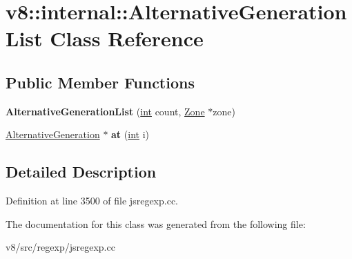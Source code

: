 \hypertarget{classv8_1_1internal_1_1AlternativeGenerationList}{}\section{v8\+:\+:internal\+:\+:Alternative\+Generation\+List Class Reference}
\label{classv8_1_1internal_1_1AlternativeGenerationList}
\subsection*{Public Member Functions}
\begin{DoxyCompactItemize}
\item 
\mbox{\label{classv8_1_1internal_1_1AlternativeGenerationList_a12e31ade267f3b97c25bf9201fe3b65a}} 
{\bfseries Alternative\+Generation\+List} (\mbox{\hyperlink{classint}{int}} count, \mbox{\hyperlink{classv8_1_1internal_1_1Zone}{Zone}} $\ast$zone)
\item 
\mbox{\label{classv8_1_1internal_1_1AlternativeGenerationList_a074eac77994a3714b4214b777fce5b2a}} 
\mbox{\hyperlink{classv8_1_1internal_1_1AlternativeGeneration}{Alternative\+Generation}} $\ast$ {\bfseries at} (\mbox{\hyperlink{classint}{int}} i)
\end{DoxyCompactItemize}


\subsection{Detailed Description}


Definition at line 3500 of file jsregexp.\+cc.



The documentation for this class was generated from the following file\+:\begin{DoxyCompactItemize}
\item 
v8/src/regexp/jsregexp.\+cc\end{DoxyCompactItemize}
